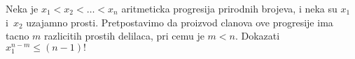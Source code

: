 \problem
Neka je $x_1 < x_2 < \ldots < x_n$ aritmeticka progresija prirodnih brojeva, i neka su $x_1$ i~$x_2$ uzajamno prosti.
Pretpostavimo da proizvod clanova ove progresije ima tacno $m$ razlicitih prostih delilaca, pri cemu je $m<n$.
Dokazati $x_1^{n-m} \leq (n - 1)!$
\solution
\endproblem
